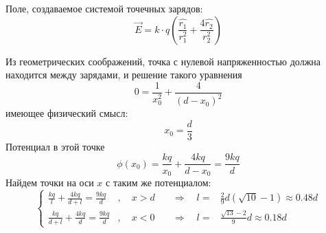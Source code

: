 \documentclass[a4paper,14pt]{extarticle}
\begin{document}
\begin{figure}[H]
    \centering
\end{figure}

Поле, создаваемое системой точечных зарядов:
\begin{equation}
	\vec{E}={k\cdot q}
	\left(
		\frac{\hat{r_1}}{r_1^2}+
		\frac{4\hat{r_2}}{r_2^2}
	\right)
\end{equation}

Из геометрических соображений, точка с нулевой напряженностью должна находится между зарядами, и решение такого уравнения
\begin{equation}
	0=
		\frac{1}{x_0^2}+
		\frac{4}{(d-x_0)^2} 
\end{equation}
имеющее физический смысл:
\begin{equation}
	x_0=\frac{d}{3}
\end{equation}
Потенциал в этой точке
\begin{equation}
	\phi(x_0)=\frac{kq}{x_0}+\frac{4kq}{d-x_0}=\frac{9kq}{d}
\end{equation}
Найдем точки на оси $x$ с таким же потенциалом:
\begin{equation}
	\left\{
	\begin{aligned}
		\frac{kq}{l}+\frac{4kq}{d+l}=\frac{9kq}{d}&, \quad x>d& \quad\Rightarrow\quad l=&\frac29d(\sqrt{10}-1)\approx0.48d\\
		\frac{kq}{d+l}+\frac{4kq}{d}=\frac{9kq}{d}&, \quad x<0& \quad\Rightarrow\quad l=&\frac{\sqrt{13}-2}{9}d\approx0.18d
	\end{aligned}
	\right.
\end{equation}


%
\end{document}
